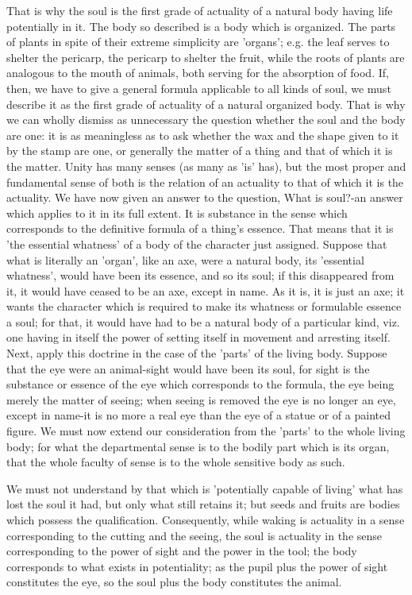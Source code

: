 That is why the soul is the first grade of actuality of a natural
body having life potentially in it. The body so described is a body
which is organized. The parts of plants in spite of their extreme
simplicity are 'organs'; e.g. the leaf serves to shelter the pericarp,
the pericarp to shelter the fruit, while the roots of plants are analogous
to the mouth of animals, both serving for the absorption of food.
If, then, we have to give a general formula applicable to all kinds
of soul, we must describe it as the first grade of actuality of a
natural organized body. That is why we can wholly dismiss as unnecessary
the question whether the soul and the body are one: it is as meaningless
as to ask whether the wax and the shape given to it by the stamp are
one, or generally the matter of a thing and that of which it is the
matter. Unity has many senses (as many as 'is' has), but the most
proper and fundamental sense of both is the relation of an actuality
to that of which it is the actuality. We have now given an answer
to the question, What is soul?-an answer which applies to it in its
full extent. It is substance in the sense which corresponds to the
definitive formula of a thing's essence. That means that it is 'the
essential whatness' of a body of the character just assigned. Suppose
that what is literally an 'organ', like an axe, were a natural body,
its 'essential whatness', would have been its essence, and so its
soul; if this disappeared from it, it would have ceased to be an axe,
except in name. As it is, it is just an axe; it wants the character
which is required to make its whatness or formulable essence a soul;
for that, it would have had to be a natural body of a particular kind,
viz. one having in itself the power of setting itself in movement
and arresting itself. Next, apply this doctrine in the case of the
'parts' of the living body. Suppose that the eye were an animal-sight
would have been its soul, for sight is the substance or essence of
the eye which corresponds to the formula, the eye being merely the
matter of seeing; when seeing is removed the eye is no longer an eye,
except in name-it is no more a real eye than the eye of a statue or
of a painted figure. We must now extend our consideration from the
'parts' to the whole living body; for what the departmental sense
is to the bodily part which is its organ, that the whole faculty of
sense is to the whole sensitive body as such. 

We must not understand by that which is 'potentially capable of living'
what has lost the soul it had, but only what still retains it; but
seeds and fruits are bodies which possess the qualification. Consequently,
while waking is actuality in a sense corresponding to the cutting
and the seeing, the soul is actuality in the sense corresponding to
the power of sight and the power in the tool; the body corresponds
to what exists in potentiality; as the pupil plus the power of sight
constitutes the eye, so the soul plus the body constitutes the animal.

